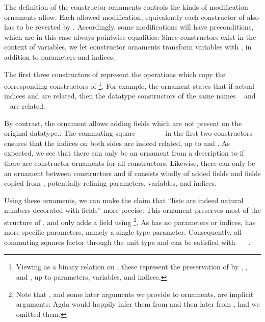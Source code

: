 The definition of the constructor ornaments  controls the kinds of modification ornaments allow. Each allowed modification, equivalently each constructor of  also has to be reverted by . Accordingly, some modifications will have preconditions, which are in this case always pointwise equalities:
Since constructors exist in the context of variables, we let constructor ornaments transform variables with , in addition to parameters and indices.

The first three constructors of  represent the operations which copy the corresponding constructors of \footnote{Viewing  as a binary relation on , these represent the preservation of  by , , and , up to parameters, variables, and indices.}.  For example, the ornament  states that if actual indices  and  are related, then the datatype constructors of the same names \  and \  are related.

By contrast, the  ornament allows adding fields which are not present on the original datatype.:
The commuting square \ \ \ \ \ \ \  in the first two constructors ensures that the indices on both sides are indeed related, up to  and . As expected, we see that there can only be an ornament from a description  to  if there are constructor ornaments for all constructors. Likewise, there can only be an ornament between constructors  and  if  consists wholly of added fields and fields copied from , potentially refining parameters, variables, and indices.

Using these ornaments, we can make the claim that ``lists are indeed natural numbers decorated with fields'' more precise:
This ornament preserves most of the structure of \bN{}, and only adds a field  using \footnote{Note that , and some later arguments we provide to ornaments, are implicit arguments: Agda would happily infer them from  and then later from , had we omitted them.}. As \bN{} has no parameters or indices,  has more specific parameters, namely a single type parameter. Consequently, all commuting squares factor through the unit type and can be satisfied with \ \AV{\_}\ \ . 

